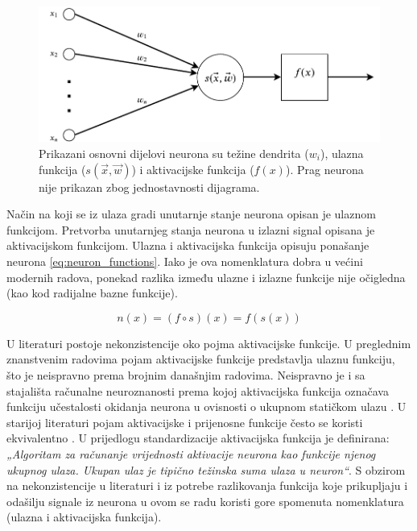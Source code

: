 \documentclass[times, utf8, numeric, diplomski]{fer}
\begin{document}
\begin{figure}[h]
\centering
\includegraphics[scale=0.7]{Neuron.pdf}
\caption{Prikazani osnovni dijelovi neurona su težine dendrita ($w_i$), ulazna funkcija ($s(\vec{x},\vec{w})$) i aktivacijske funkcija ($f(x)$). Prag neurona nije prikazan zbog jednostavnosti dijagrama.}
\label{fig:neuron}
\end{figure}

Način na koji se iz ulaza gradi unutarnje stanje neurona opisan je ulaznom funkcijom. Pretvorba unutarnjeg stanja neurona u izlazni signal opisana je aktivacijskom funkcijom. Ulazna i aktivacijska funkcija opisuju ponašanje neurona \eqref{eq:neuron_functions}. Iako je ova nomenklatura dobra u većini modernih radova, ponekad razlika između ulazne i izlazne funkcije nije očigledna (kao kod radijalne bazne funkcije).

\begin{equation}
\label{eq:neuron_functions}
n(x) = (f \circ s)(x) = f(s(x))
\end{equation}

U literaturi postoje nekonzistencije oko pojma aktivacijske funkcije. U preglednim znanstvenim radovima \citep{function_survey1, function_survey2, function_survey3} pojam aktivacijske funkcije predstavlja ulaznu funkciju, što je neispravno prema brojnim današnjim radovima. Neispravno je i sa stajališta računalne neuroznanosti prema kojoj aktivacijska funkcija označava funkciju učestalosti okidanja neurona u ovisnosti o ukupnom statičkom ulazu \citep[str.~234]{neuroscience}. U starijoj literaturi pojam aktivacijske i prijenosne funkcije često se koristi ekvivalentno \citep{evolving_transfer, evo_parsimonious}. U prijedlogu standardizacije \citet{ieee_standardization} aktivacijska funkcija je definirana: \textit{„Algoritam za računanje vrijednosti aktivacije neurona kao funkcije njenog ukupnog ulaza. Ukupan ulaz je tipično težinska suma ulaza u neuron“}. S obzirom na nekonzistencije u literaturi i iz potrebe razlikovanja funkcija koje prikupljaju i odašilju signale iz neurona u ovom se radu koristi gore spomenuta nomenklatura (ulazna i aktivacijska funkcija).
\end{document}
